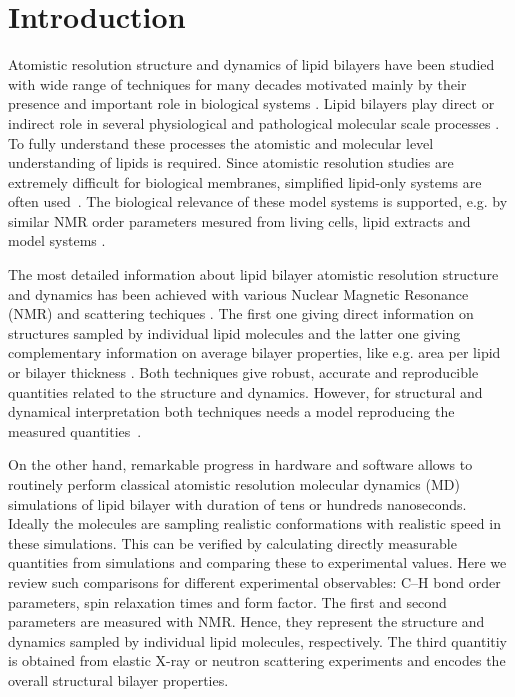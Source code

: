 \documentclass[aps,prl,superscriptaddress,twocolumn]{revtex4}
\begin{document}
\section{Introduction}
Atomistic resolution structure and dynamics of lipid bilayers have been studied
with wide range of techniques for many decades motivated mainly
by their presence and important role in biological systems \cite{seelig77c,israelachvili80,jacobs81,davis83,bloom91,nagle00,nagle13}.
Lipid bilayers play direct or indirect role in several physiological and pathological
molecular scale processes \cite{lee04,kinnunen09,kinnunen12,Bohdanowicz13}. To fully understand these processes the atomistic and
molecular level understanding of lipids is required. Since atomistic resolution studies are
extremely difficult for biological membranes, simplified lipid-only systems are often used~\cite{seelig77c,israelachvili80,jacobs81,davis83,bloom91,nagle00,nagle13}.
The biological relevance of these model systems is supported, e.g. by similar NMR order parameters 
mesured from living cells, lipid extracts and model systems \cite{gally81,jacobs81,scherer87}. 

The most detailed information about lipid bilayer atomistic resolution structure and dynamics has been
achieved with various Nuclear Magnetic Resonance (NMR) and scattering techiques \cite{seelig77c,jacobs81,davis83,bloom91,nagle00,pabst10,kucerka11,marquardt15}. 
The first one giving direct information on structures sampled by individual lipid molecules \cite{seelig77c,jacobs81,davis83,bloom91} and
the latter one giving complementary information on average bilayer properties, like e.g. area per lipid or bilayer thickness \cite{nagle00,pabst10,kucerka11,marquardt15}.
Both techniques give robust, accurate and reproducible quantities related to the structure and dynamics.
However, for structural and dynamical interpretation both techniques needs a model reproducing
the measured quantities~\cite{jacobs81,davis83,bloom91,nagle00,pabst10,kucerka11,marquardt15}. 

On the other hand, remarkable progress in hardware and software allows to 
routinely perform classical atomistic resolution molecular dynamics (MD) simulations of lipid bilayer with 
duration of tens or hundreds nanoseconds. Ideally the molecules are sampling realistic
conformations with realistic speed in these simulations. This can be verified by calculating
directly measurable quantities from simulations and comparing these to experimental values.
Here we review such comparisons for different experimental observables: C--H bond order parameters,
spin relaxation times and form factor. The first and second parameters are measured with NMR. Hence, they 
represent the structure and dynamics sampled by individual lipid molecules, respectively.
The third quantitiy is obtained from elastic X-ray or neutron scattering experiments and encodes the overall structural bilayer properties.
\end{document}
